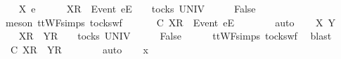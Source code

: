 \begin{isabellebody}
\ \ \isamarkupfalse%
\ X\ e\ {\isasymrho}\ {\isasymsigma}{\isacharprime}{\isacharprime}\isanewline
\ \ \isamarkupfalse%
\ {\isachardoublequoteopen}{\isacharbrackleft}X{\isacharbrackright}\isactrlsub R\ {\isacharhash}\ {\isacharbrackleft}Event\ e{\isacharbrackright}\isactrlsub E\ {\isacharhash}\ {\isasymsigma}{\isacharprime}{\isacharprime}\ {\isasymin}\ tocks\ UNIV{\isachardoublequoteclose}\isanewline
\ \ \isamarkupfalse%
\ \isamarkupfalse%
\ {\isachardoublequoteopen}False{\isachardoublequoteclose}\isanewline
\ \ \ \ \isamarkupfalse%
\ {\isacharparenleft}meson\ ttWF{\isachardot}simps{\isacharparenleft}{}{}{\isacharparenright}\ tocks{\isacharunderscore}wf{\isacharparenright}\isanewline
\ \ \isamarkupfalse%
\ \isamarkupfalse%
\ {\isachardoublequoteopen}{\isasymrho}\ {\isasymlesssim}\isactrlsub C\ {\isacharbrackleft}X{\isacharbrackright}\isactrlsub R\ {\isacharhash}\ {\isacharbrackleft}Event\ e{\isacharbrackright}\isactrlsub E\ {\isacharhash}\ {\isasymsigma}{\isacharprime}{\isacharprime}{\isachardoublequoteclose}\isanewline
\ \ \ \ \isamarkupfalse%
\ auto\isanewline
{}\isamarkupfalse%
\isanewline
\ \ \isamarkupfalse%
\ X\ Y\ {\isasymrho}\ {\isasymsigma}{\isacharprime}{\isacharprime}\isanewline
\ \ \isamarkupfalse%
\ {\isachardoublequoteopen}{\isacharbrackleft}X{\isacharbrackright}\isactrlsub R\ {\isacharhash}\ {\isacharbrackleft}Y{\isacharbrackright}\isactrlsub R\ {\isacharhash}\ {\isasymsigma}{\isacharprime}{\isacharprime}\ {\isasymin}\ tocks\ UNIV{\isachardoublequoteclose}\isanewline
\ \ \isamarkupfalse%
\ \isamarkupfalse%
\ {\isachardoublequoteopen}False{\isachardoublequoteclose}\isanewline
\ \ \ \ \isamarkupfalse%
\ ttWF{\isachardot}simps{\isacharparenleft}{}{}{\isacharparenright}\ tocks{\isacharunderscore}wf\ \isamarkupfalse%
\ blast\isanewline
\ \ \isamarkupfalse%
\ \isamarkupfalse%
\ {\isachardoublequoteopen}{\isasymrho}\ {\isasymlesssim}\isactrlsub C\ {\isacharbrackleft}X{\isacharbrackright}\isactrlsub R\ {\isacharhash}\ {\isacharbrackleft}Y{\isacharbrackright}\isactrlsub R\ {\isacharhash}\ {\isasymsigma}{\isacharprime}{\isacharprime}{\isachardoublequoteclose}\isanewline
\ \ \ \ \isamarkupfalse%
\ auto\isanewline
{}\isamarkupfalse%
\isanewline
\ \ \isamarkupfalse%
\ x\ {\isasymrho}\ {\isasymsigma}{\isacharprime}{\isacharprime}\isanewline

\end{isabellebody}
